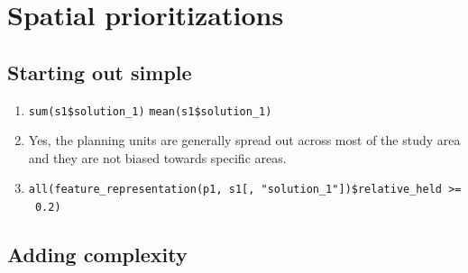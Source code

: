 \documentclass[
  12pt,
]{book}
\makeatletter
\providecommand{\tightlist}{%
  \setlength{\itemsep}{0pt}\setlength{\parskip}{0pt}}
\newenvironment{kframe}{%
\medskip{}
\setlength{\fboxsep}{.8em}
 \def\at@end@of@kframe{}%
 \ifinner\ifhmode%
  \def\at@end@of@kframe{\end{minipage}}%
  \begin{minipage}{\columnwidth}%
 \fi\fi%
 \def\FrameCommand##1{\hskip\@totalleftmargin \hskip-\fboxsep
 \colorbox{shadecolor}{##1}\hskip-\fboxsep
     \hskip-\linewidth \hskip-\@totalleftmargin \hskip\columnwidth}%
 \MakeFramed {\advance\hsize-\width
   \@totalleftmargin\z@ \linewidth\hsize
   \@setminipage}}%
 {\par\unskip\endMakeFramed%
 \at@end@of@kframe}
\newenvironment{rmdblock}[1]
  {
  \begin{itemize}
  \renewcommand{\labelitemi}{
    \raisebox{-.7\height}[0pt][0pt]{
      {\setkeys{Gin}{width=3em,keepaspectratio}\texttt{[image: images/\#1]}}
    }
  }
  \setlength{\fboxsep}{1em}
  \begin{kframe}
  \item
  }
  {
  \end{kframe}
  \end{itemize}
  }
\newenvironment{rmdanswer}
  {\begin{rmdblock}{answer}}
  {\end{rmdblock}}
\makeatother
\begin{document}
\hypertarget{spatial-prioritizations-1}{%
\section{Spatial prioritizations}\label{spatial-prioritizations-1}}

\hypertarget{starting-out-simple-1}{%
\subsection{Starting out simple}\label{starting-out-simple-1}}

\begin{rmdanswer}
\begin{enumerate}
\def\labelenumi{\arabic{enumi}.}
\tightlist
\item
  \texttt{sum(s1\$solution\_1)} \newline
  \texttt{mean(s1\$solution\_1)}
\item
  Yes, the planning units are generally spread out across most of the study area and they are not biased towards specific areas.
\item
  \texttt{all(feature\_representation(p1,\ s1{[},\ "solution\_1"{]})\$relative\_held\ \textgreater{}=\ 0.2)}
\end{enumerate}
\end{rmdanswer}

\hypertarget{adding-complexity-1}{%
\subsection{Adding complexity}\label{adding-complexity-1}}
\end{document}
